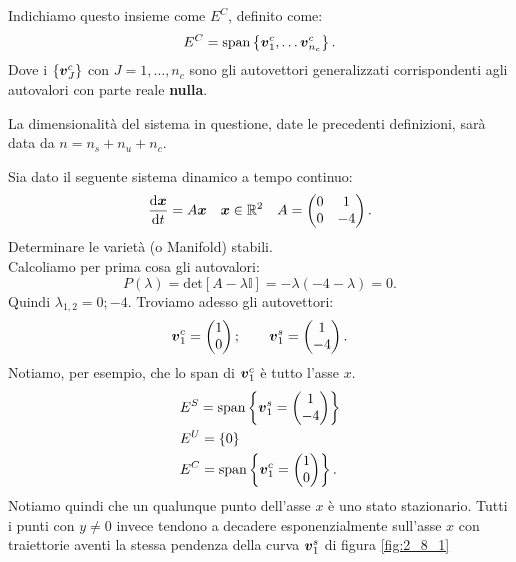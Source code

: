 \noindent
\begin{defn}
    Indichiamo questo insieme come $E^C$, definito come:
    \[
        E^C = \text{span}\left\{\boldsymbol{v}_1^c, \ldots \boldsymbol{v}_{n_c}^c\right\}
    .\] 
    Dove i $\left\{\boldsymbol{v}_J^c\right\}$ con $J = 1,\ldots, n_c$ sono gli autovettori generalizzati corrispondenti agli autovalori con parte reale \textbf{nulla}.
\end{defn}
\noindent
La dimensionalità del sistema in questione, date le precedenti definizioni, sarà data da $n = n_s + n_u + n_c$.
\begin{exmp}
    Sia dato il seguente sistema dinamico a tempo continuo:
    \[
        \frac{\text{d} \boldsymbol{x}}{\text{d} t} = A \boldsymbol{x} \quad  \boldsymbol{x}\in \mathbb{R}^2 \quad
	A = 
    \begin{pmatrix}
	0  & 1 \\
	0 & -4 \\
    \end{pmatrix}
    .\] 
    Determinare le varietà (o Manifold) stabili.\\
    Calcoliamo per prima cosa gli autovalori:
    \[
	P(\lambda) = \text{det}\left[A-\lambda\mathbb{I}\right] = -\lambda (-4-\lambda) =0
    .\] 
    Quindi $\lambda_{1, 2} = 0; -4$. Troviamo adesso gli autovettori:
    \[
	\boldsymbol{v}_{1}^c = \begin{pmatrix} 1 \\ 0 \end{pmatrix}; \qquad  \boldsymbol{v}_{1}^s = \begin{pmatrix} 1 \\ - 4 \end{pmatrix} 
    .\] 
    Notiamo, per esempio, che lo span di $\boldsymbol{v}_1^c$ è tutto l'asse $x$.
    \[\begin{aligned}
	&E^S = \text{span}\left\{\boldsymbol{v}_1^s = \begin{pmatrix} 1 \\ -4 \end{pmatrix} \right\}\\
	&E^U = \left\{0\right\}\\
	&E^C = \text{span}\left\{\boldsymbol{v}_1^c = \begin{pmatrix} 1 \\ 0 \end{pmatrix} \right\}
    .\end{aligned}\]
    Notiamo quindi che un qualunque punto dell'asse $x$ è uno stato stazionario. Tutti i punti con $y\neq 0$ invece tendono a decadere esponenzialmente sull'asse $x$ con traiettorie aventi la stessa pendenza della curva $\boldsymbol{v}_1^s$ di figura \ref{fig:2_8_1}
\end{exmp}
